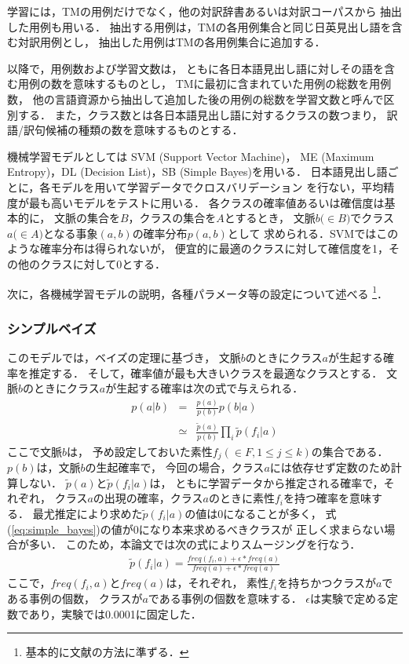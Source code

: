 学習には，TMの用例だけでなく，他の対訳辞書あるいは対訳コーパスから
抽出した用例も用いる．
抽出する用例は，TMの各用例集合と同じ日英見出し語を含む対訳用例とし，
抽出した用例はTMの各用例集合に追加する．

以降で，用例数および学習文数は，
ともに各日本語見出し語に対しその語を含む用例の数を意味するものとし，
TMに最初に含まれていた用例の総数を用例数，
他の言語資源から抽出して追加した後の用例の総数を学習文数と呼んで区別する．
また，クラス数とは各日本語見出し語に対するクラスの数つまり，
訳語/訳句候補の種類の数を意味するものとする．

機械学習モデルとしては SVM (Support Vector Machine)，
ME (Maximum Entropy)，DL (Decision List)，SB (Simple Bayes)を用いる．
日本語見出し語ごとに，各モデルを用いて学習データでクロスバリデーション
を行ない，平均精度が最も高いモデルをテストに用いる．
各クラスの確率値あるいは確信度は基本的に，
文脈の集合を$B$，クラスの集合を$A$とするとき，
文脈$b (\in$$B)$でクラス$a (\in$$A)$となる事象$(a,b)$の確率分布$p(a,b)$として
求められる．SVMではこのような確率分布は得られないが，
便宜的に最適のクラスに対して確信度を1，その他のクラスに対して0とする．

次に，各機械学習モデルの説明，各種パラメータ等の設定について述べる
\footnote{基本的に文献\cite{Murata2001a}の方法に準ずる．}．

\subsubsection{シンプルベイズ}

このモデルでは，ベイズの定理に基づき，
文脈$b$のときにクラス$a$が生起する確率を推定する．
そして，確率値が最も大きいクラスを最適なクラスとする．
文脈$b$のときにクラス$a$が生起する確率は次の式で与えられる．
{
\begin{eqnarray}
  p(a|b)  & = & \frac{p(a)}{p(b)}p(b|a)\\ 
  \label{eq:simple_bayes}
  & \simeq & \frac{\tilde{p}(a)}{p(b)} \prod_i \tilde{p}(f_i|a)
\end{eqnarray}
}
ここで文脈$b$は，
予め設定しておいた素性$f_j (\in F, 1\leq j\leq k)$の集合である．
$p(b)$は，文脈$b$の生起確率で，
今回の場合，クラス$a$には依存せず定数のため計算しない．
$\tilde{p}(a)$と$\tilde{p}(f_i|a)$は，
ともに学習データから推定される確率で，それぞれ，
クラス$a$の出現の確率，クラス$a$のときに素性$f_i$を持つ確率を意味する．
最尤推定により求めた$\tilde{p}(f_i|a)$の値は0になることが多く，
式(\ref{eq:simple_bayes})の値が0になり本来求めるべきクラスが
正しく求まらない場合が多い．
このため，本論文では次の式によりスムージングを行なう．
{
\begin{eqnarray}
  \label{eq:simple_bayes2}
  \tilde{p}(f_i|a) = \frac{freq(f_i,a)+\epsilon*freq(a)}{freq(a)+\epsilon*freq(a)}
\end{eqnarray}
}
ここで，$freq(f_i,a)$と$freq(a)$は，それぞれ，
素性$f_i$を持ちかつクラスが$a$である事例の個数，
クラスが$a$である事例の個数を意味する．
$\epsilon$は実験で定める定数であり，実験では0.0001に固定した．

